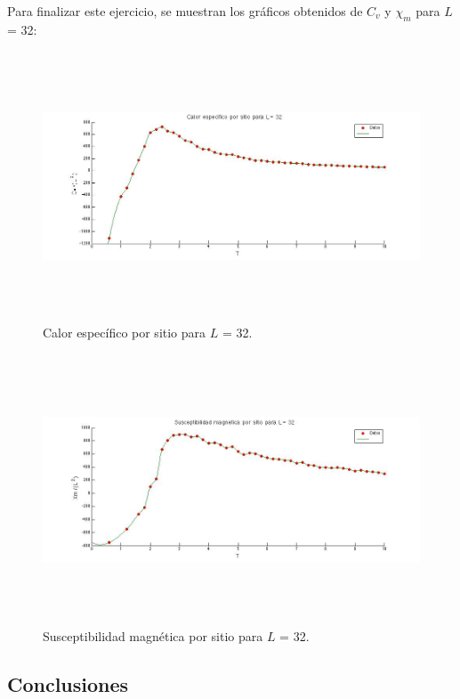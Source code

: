 \documentclass[a4paper,12pt]{article}
\begin{document}
Para finalizar este ejercicio, se muestran los gr\'aficos obtenidos de $C_{v}$ y $\chi_{m}$ para $L$ = 32:

\begin{figure}[H]
\begin{center}
\includegraphics[height=8cm]{../graficos/Cv_L32.jpg}
\caption[width=5cm]{Calor espec\'ifico por sitio para $L$ = 32.}
\end{center}
\end{figure}

\begin{figure}[H]
\begin{center}
\includegraphics[height=8cm]{../graficos/Xm_L32.jpg}
\caption[width=5cm]{Susceptibilidad magn\'etica por sitio para $L$ = 32.}
\end{center}
\end{figure}

\subsection{Conclusiones}
\end{document}
